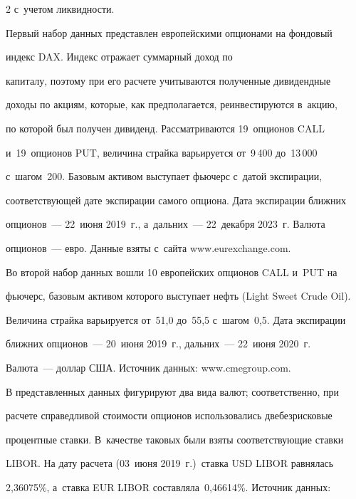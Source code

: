\begin{multicols}{2}
с~учетом ликвидности.


  


  Первый набор данных представлен европейскими опционами на фондовый 


индекс DAX. Индекс отражает суммарный доход по 


капиталу, поэтому при его расчете учитываются полученные дивидендные 


доходы по акциям, которые, как предполагается, реинвестируются в~акцию, 


по которой был получен дивиденд. Рас\-смат\-ри\-ва\-ют\-ся 19~опционов CALL 


и~19~опционов PUT, величина страйка варьируется от~9\,400 до~13\,000 


с~шагом~200. Базовым активом выступает фьючерс с~датой экспирации, 


соответствующей дате экспирации самого опциона. Дата экспирации ближних 


опционов~--- 22~июня 2019~г., а~дальних~--- 22~декабря 2023~г. Валюта 


опционов~--- евро. Данные взяты с~сайта {\sf www.eurexchange.com}.


  


  Во второй набор данных вошли 10 европейских опционов CALL и~PUT на 


фьючерс, базовым активом которого выступает нефть (Light Sweet Crude Oil). 


Величина страйка варьируется от~51,0 до~55,5 с~шагом~0,5. Дата экспирации 


ближних опционов~--- 20~июня 2019~г., дальних~--- 22~июня 2020~г. 


Валюта~--- доллар США. Источник данных: {\sf www.cmegroup.com}.


  


  В представленных данных фигурируют два вида валют; соответственно, при 


расчете справедливой стоимости опционов использовались две\linebreak безрисковые 


процентные ставки. В~качестве таковых были взяты соответствующие ставки 


LIBOR. На дату расчета (03~июня 2019~г.)\ ставка USD \mbox{LIBOR} равнялась 


2,36075\%, а~ставка EUR \mbox{LIBOR} со\-став\-ля\-ла~0,46614\%. Источник данных: 



\end{multicols}
